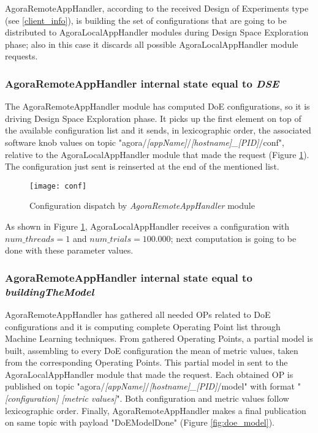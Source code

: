 AgoraRemoteAppHandler, according to the received Design of Experiments type (see \ref{client_info}), is building the set of configurations that are going to be distributed to AgoraLocalAppHandler modules during Design Space Exploration phase; also in this case it discards all possible AgoraLocalAppHandler module requests.


\subsubsection{AgoraRemoteAppHandler internal state equal to \textit{DSE}}\label{dse_conf}

The AgoraRemoteAppHandler module has computed DoE configurations, so it is driving Design Space Exploration phase. It picks up the first element on top of the available configuration list and it sends, in lexicographic order, the associated software knob values on topic "agora\slash{}\textit{[appName]}\slash{}\textit{[hostname]\_[PID]}\slash{}conf", relative to the AgoraLocalAppHandler module that made the request (Figure \ref{fig:conf}). The configuration just sent is reinserted at the end of the mentioned list.

\begin{figure}[ht]

    \centering
    \texttt{[image: conf]}
    \caption{Configuration dispatch by \textit{AgoraRemoteAppHandler} module}
    \label{fig:conf}
    
\end{figure}

As shown in Figure \ref{fig:conf}, AgoraLocalAppHandler receives a configuration with $num\_threads = 1$ and $num\_trials = 100.000$; next computation is going to be done with these parameter values.


\subsubsection{AgoraRemoteAppHandler internal state equal to \textit{building\-The\-Model}}\label{DoEModelSend}

AgoraRemoteAppHandler has gathered all needed OPs related to DoE configurations and it is computing complete Operating Point list through Machine Learning techniques. From gathered Operating Points, a partial model is built, assembling to every DoE configuration the mean of metric values, taken from the corresponding Operating Points. This partial model in sent to the Agora\-Local\-App\-Handler module that made the request. Each obtained OP is published on topic "agora\slash{}\textit{[appName]}\slash{}\textit{[hostname]\_[PID]}\slash{}mod\-el" with format "\textit{[configuration] [metric values]}". Both configuration and metric values follow lexicographic order. Finally, AgoraRemoteAppHandler makes a final publication on same topic with payload "DoEModelDone" (Figure \ref{fig:doe_model}).

